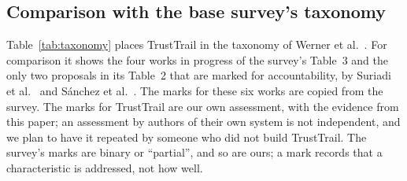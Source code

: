 \subsection{Comparison with the base survey's taxonomy}
\label{sec:eval-taxonomy}
Table~\ref{tab:taxonomy} places TrustTrail in the taxonomy of Werner et al.~\cite{werner2017survey}. For comparison it shows the four works in progress of the survey's Table~3 and the only two proposals in its Table~2 that are marked for accountability, by Suriadi et al.~\cite{suriadi2009usercentric} and Sánchez et al.~\cite{sanchez2012enhancing}. The marks for these six works are copied from the survey. The marks for TrustTrail are our own assessment, with the evidence from this paper; an assessment by authors of their own system is not independent, and we plan to have it repeated by someone who did not build TrustTrail. The survey's marks are binary or ``partial'', and so are ours; a mark records that a characteristic is addressed, not how well.

